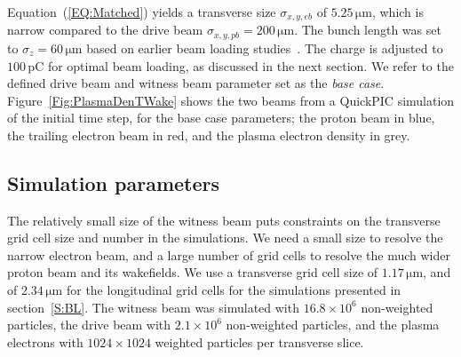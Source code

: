 \documentclass[aps,prstab,reprint,amsmath,amssymb,groupedaddress]{revtex4-1}
\newcommand{\unit}[1]{\,\mathrm{#1}}
\newcommand{\nexp}[1]{\times 10^{#1}}
\begin{document}
Equation~(\ref{EQ:Matched}) yields a transverse size $\sigma_{x,y,eb}$ of $5.25\unit{\mu m}$, which is narrow compared
to the drive beam $\sigma_{x,y,pb} = 200\unit{\mu m}$. The bunch length was set to $\sigma_{z} = 60\unit{\mu m}$ based
on earlier beam loading studies~\cite{berglyd_olsen:2016}. The charge is adjusted to $100\unit{pC}$ for optimal beam
loading, as discussed in the next section. We refer to the defined drive beam and witness beam parameter set as the
\emph{base case}. Figure~\ref{Fig:PlasmaDenTWake} shows the two beams from a QuickPIC simulation of the initial time
step, for the base case parameters; the proton beam in blue, the trailing electron beam in red, and the plasma electron
density in grey. 



\subsection{Simulation parameters}\label{SIM}

The relatively small size of the witness beam puts constraints on the transverse grid cell size and number in the
simulations. We need a small size to resolve the narrow electron beam, and a large number of grid cells to resolve the
much wider proton beam and its wakefields. We use a transverse grid cell size of $1.17\unit{\mu m}$, and of
$2.34\unit{\mu m}$ for the longitudinal grid cells for the simulations presented in section~\ref{S:BL}. The witness beam
was simulated with $16.8\nexp{6}$ non-weighted particles, the drive beam with $2.1\nexp{6}$ non-weighted particles, and
the plasma electrons with $1024 \times 1024$ weighted particles per transverse slice.
\end{document}
